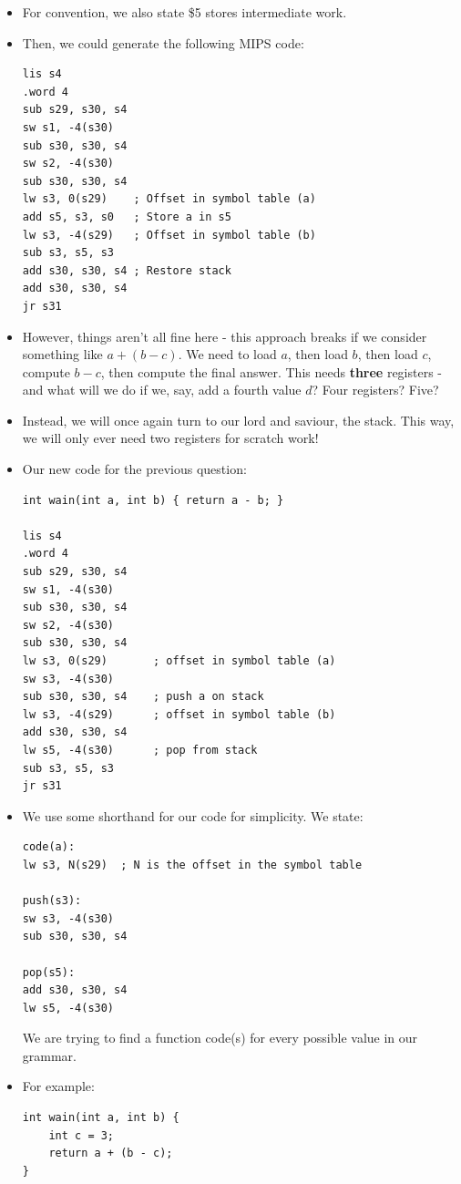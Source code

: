 \documentclass[12pt]{article}
\begin{document}
\begin{itemize}
    \item For convention, we also state \$5 stores intermediate work.
    \item Then, we could generate the following MIPS code:
\begin{lstlisting}[mathescape, numbers=none, breaklines=true]
lis s4
.word 4
sub s29, s30, s4
sw s1, -4(s30)
sub s30, s30, s4
sw s2, -4(s30)
sub s30, s30, s4
lw s3, 0(s29)    ; Offset in symbol table (a)
add s5, s3, s0   ; Store a in s5
lw s3, -4(s29)   ; Offset in symbol table (b)
sub s3, s5, s3
add s30, s30, s4 ; Restore stack 
add s30, s30, s4
jr s31
\end{lstlisting}
    \item However, things aren't all fine here - this approach breaks if we consider something like $a + (b - c)$.  We need to load $a$, then load $b$, then load $c$, compute $b - c$, then compute the final answer.  This needs \textbf{three} registers - and what will we do if we, say, add a fourth value $d$?  Four registers?  Five? 
    \item Instead, we will once again turn to our lord and saviour, the stack.  This way, we will only ever need two registers for scratch work!
    \item Our new code for the previous question:
\begin{lstlisting}[mathescape, numbers=none, breaklines=true]
int wain(int a, int b) { return a - b; }

lis s4
.word 4
sub s29, s30, s4
sw s1, -4(s30)
sub s30, s30, s4
sw s2, -4(s30)
sub s30, s30, s4
lw s3, 0(s29)       ; offset in symbol table (a)
sw s3, -4(s30)
sub s30, s30, s4    ; push a on stack
lw s3, -4(s29)      ; offset in symbol table (b)
add s30, s30, s4
lw s5, -4(s30)      ; pop from stack
sub s3, s5, s3
jr s31
\end{lstlisting}
    \item We use some shorthand for our code for simplicity.  We state:
\begin{lstlisting}[mathescape, numbers=none, breaklines=true]
code(a):
lw s3, N(s29)  ; N is the offset in the symbol table

push(s3):
sw s3, -4(s30)
sub s30, s30, s4

pop(s5):
add s30, s30, s4
lw s5, -4(s30)
\end{lstlisting}
    We are trying to find a function code(s) for every possible value in our grammar.
    \item For example:
\begin{lstlisting}[mathescape, numbers=none, breaklines=true]
int wain(int a, int b) {
    int c = 3;
    return a + (b - c);
}


\end{lstlisting}
\end{itemize}
\end{document}
